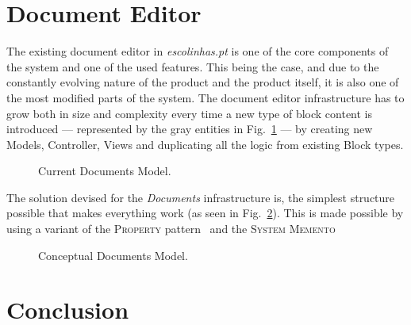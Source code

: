 \documentclass[9pt,a4paper]{extarticle}
\begin{document}
\begin{multicols}{2}
\section{Document Editor}\label{sec:document_editor}

The existing document editor in \emph{escolinhas.pt} is one of the core components of the system and one of the used features. This being the case, and due to the constantly evolving nature of the product and the product itself, it is also one of the most modified parts of the system. The document editor infrastructure has to grow both in size and complexity every time a new type of block content is introduced --- represented by the gray entities in Fig.~\ref{fig:documents_current} --- by creating new Models, Controller, Views and duplicating all the logic from existing Block types.

\begin{figure}[H]
  \caption{Current Documents Model.}
  \label{fig:documents_current}
\end{figure}

The solution devised for the \emph{Documents} infrastructure is, the simplest structure possible that makes everything work (as seen in Fig.~\ref{fig:documents_conceptual}). This is made possible by using a variant of the \textsc{Property} pattern~\cite{metadata_and_active_object_models} and the \textsc{System Memento}~\cite{patterns_data_and_metadata_evolution_in_aoms}

\begin{figure}[H]
  \caption{Conceptual Documents Model.}
  \label{fig:documents_conceptual}
\end{figure}

\section{Conclusion}\label{sec:conclusion}


\end{multicols}
\end{document}
